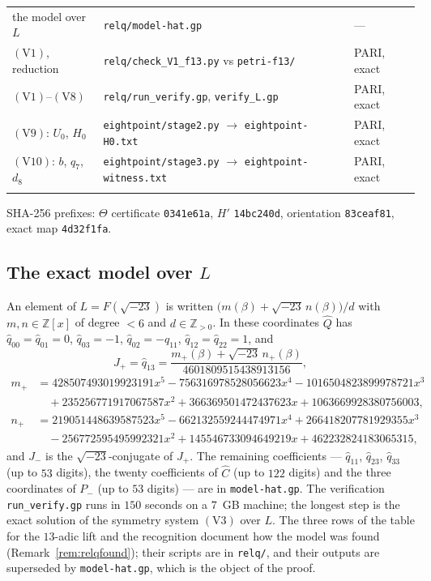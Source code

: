 \documentclass[11pt]{amsart}
\newif\ifrelqclosed
\newcommand{\ZZ}{\mathbb{Z}}
\newcommand{\sqm}{\sqrt{-23}}
\theoremstyle{plain}
\theoremstyle{definition}
\begin{document}
{\begin{center}
\begin{tabular}{@{}lll@{}}
the model over $L$ & \texttt{relq/model-hat.gp} & ---\\
$(\mathrm V1)$, reduction & \texttt{relq/check\_V1\_f13.py} vs \texttt{petri-f13/} & PARI, exact\\
$(\mathrm V1)$--$(\mathrm V8)$ & \texttt{relq/run\_verify.gp}, \texttt{verify\_L.gp} & PARI, exact\\
$(\mathrm V9)$: $U_0$, $H_0$ & \texttt{eightpoint/stage2.py} $\to$ \texttt{eightpoint-H0.txt} & PARI, exact\\
$(\mathrm V10)$: $b$, $q_7$, $d_8$ & \texttt{eightpoint/stage3.py} $\to$ \texttt{eightpoint-witness.txt} & PARI, exact\\
\fi
\bottomrule
\end{tabular}
\end{center}}
SHA-256 prefixes: $\Theta$ certificate \texttt{0341e61a}, $H'$
\texttt{14bc240d}, orientation \texttt{83ceaf81}, exact map
\texttt{4d32f1fa}\ifrelqclosed, model over $L$ \texttt{7423ca42}, $H_0$
(\texttt{eightpoint-H0.txt}) \texttt{df9eb6d1}, eight-point witness
(\texttt{eightpoint-witness.txt}) \texttt{8380a45e}\fi.

\ifrelqclosed
\subsection*{The exact model over $L$}
An element of $L=F(\sqm)$ is written
$\bigl(m(\beta)+\sqm\,n(\beta)\bigr)/d$ with $m,n\in\ZZ[x]$ of
degree $<6$ and $d\in\ZZ_{>0}$. In these coordinates $\hat Q$ has
$\hat q_{00}=\hat q_{01}=0$, $\hat q_{03}=-1$,
$\hat q_{02}=-\hat q_{11}$, $\hat q_{12}=\hat q_{22}=1$, and
\[
  J_+=\hat q_{13}
  =\frac{m_+(\beta)+\sqm\,n_+(\beta)}{4601809515438913156},
\]
\[
\begin{aligned}
 m_+&=428507493019923191x^5-756316978528056623x^4-1016504823899978721x^3\\
   &\quad+235256771917067587x^2+366369501472437623x+1063669928380756003,\\
 n_+&=219051448639587523x^5-662132559244474971x^4+266418207781929355x^3\\
   &\quad-256772595495992321x^2+145546733094649219x+462232824183065315,
\end{aligned}
\]
and $J_-$ is the $\sqm$-conjugate of $J_+$. The remaining coefficients --- $\hat q_{11}$,
$\hat q_{23}$, $\hat q_{33}$ (up to $53$ digits), the twenty
coefficients of $\hat C$ (up to $122$ digits) and the three
coordinates of $P_-$ (up to $53$ digits) --- are in
\texttt{model-hat.gp}. The verification
\texttt{run\_verify.gp} runs in $150$ seconds on a $7$~GB machine;
the longest step is the exact solution of the symmetry system
$(\mathrm V3)$ over $L$. The three rows of the table for the $13$-adic
lift and the recognition document how the model was found
(Remark~\ref{rem:relqfound}); their scripts are in \texttt{relq/}, and
their outputs are superseded by \texttt{model-hat.gp}, which is the
object of the proof.
\end{document}
